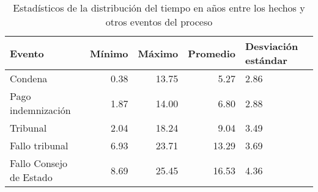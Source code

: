 \begin{table}[htbp]
\centering
\caption{Estadísticos de la distribución del
tiempo en años entre los hechos y otros eventos del proceso} 
\label{tab:hechos-evento}
\begin{tabular}{lrrrR{2cm}}
  \hline
Evento & Mínimo & Máximo & Promedio & Desviación estándar \\ 
  \hline
Condena & 0.38 & 13.75 & 5.27 & 2.86 \\ 
  Pago indemnización & 1.87 & 14.00 & 6.80 & 2.88 \\ 
  Tribunal & 2.04 & 18.24 & 9.04 & 3.49 \\ 
  Fallo tribunal & 6.93 & 23.71 & 13.29 & 3.69 \\ 
  Fallo Consejo de Estado & 8.69 & 25.45 & 16.53 & 4.36 \\ 
   \hline
\end{tabular}
\end{table}
